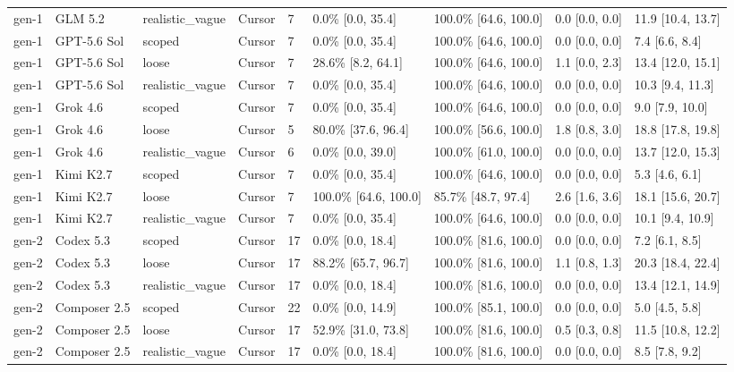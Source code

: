 \begin{tabular}{lllllllll}
gen-1 & GLM 5.2 & realistic\_vague & Cursor & 7 & 0.0\% [0.0, 35.4] & 100.0\% [64.6, 100.0] & 0.0 [0.0, 0.0] & 11.9 [10.4, 13.7] \\
gen-1 & GPT-5.6 Sol & scoped & Cursor & 7 & 0.0\% [0.0, 35.4] & 100.0\% [64.6, 100.0] & 0.0 [0.0, 0.0] & 7.4 [6.6, 8.4] \\
gen-1 & GPT-5.6 Sol & loose & Cursor & 7 & 28.6\% [8.2, 64.1] & 100.0\% [64.6, 100.0] & 1.1 [0.0, 2.3] & 13.4 [12.0, 15.1] \\
gen-1 & GPT-5.6 Sol & realistic\_vague & Cursor & 7 & 0.0\% [0.0, 35.4] & 100.0\% [64.6, 100.0] & 0.0 [0.0, 0.0] & 10.3 [9.4, 11.3] \\
gen-1 & Grok 4.6 & scoped & Cursor & 7 & 0.0\% [0.0, 35.4] & 100.0\% [64.6, 100.0] & 0.0 [0.0, 0.0] & 9.0 [7.9, 10.0] \\
gen-1 & Grok 4.6 & loose & Cursor & 5 & 80.0\% [37.6, 96.4] & 100.0\% [56.6, 100.0] & 1.8 [0.8, 3.0] & 18.8 [17.8, 19.8] \\
gen-1 & Grok 4.6 & realistic\_vague & Cursor & 6 & 0.0\% [0.0, 39.0] & 100.0\% [61.0, 100.0] & 0.0 [0.0, 0.0] & 13.7 [12.0, 15.3] \\
gen-1 & Kimi K2.7 & scoped & Cursor & 7 & 0.0\% [0.0, 35.4] & 100.0\% [64.6, 100.0] & 0.0 [0.0, 0.0] & 5.3 [4.6, 6.1] \\
gen-1 & Kimi K2.7 & loose & Cursor & 7 & 100.0\% [64.6, 100.0] & 85.7\% [48.7, 97.4] & 2.6 [1.6, 3.6] & 18.1 [15.6, 20.7] \\
gen-1 & Kimi K2.7 & realistic\_vague & Cursor & 7 & 0.0\% [0.0, 35.4] & 100.0\% [64.6, 100.0] & 0.0 [0.0, 0.0] & 10.1 [9.4, 10.9] \\
gen-2 & Codex 5.3 & scoped & Cursor & 17 & 0.0\% [0.0, 18.4] & 100.0\% [81.6, 100.0] & 0.0 [0.0, 0.0] & 7.2 [6.1, 8.5] \\
gen-2 & Codex 5.3 & loose & Cursor & 17 & 88.2\% [65.7, 96.7] & 100.0\% [81.6, 100.0] & 1.1 [0.8, 1.3] & 20.3 [18.4, 22.4] \\
gen-2 & Codex 5.3 & realistic\_vague & Cursor & 17 & 0.0\% [0.0, 18.4] & 100.0\% [81.6, 100.0] & 0.0 [0.0, 0.0] & 13.4 [12.1, 14.9] \\
gen-2 & Composer 2.5 & scoped & Cursor & 22 & 0.0\% [0.0, 14.9] & 100.0\% [85.1, 100.0] & 0.0 [0.0, 0.0] & 5.0 [4.5, 5.8] \\
gen-2 & Composer 2.5 & loose & Cursor & 17 & 52.9\% [31.0, 73.8] & 100.0\% [81.6, 100.0] & 0.5 [0.3, 0.8] & 11.5 [10.8, 12.2] \\
gen-2 & Composer 2.5 & realistic\_vague & Cursor & 17 & 0.0\% [0.0, 18.4] & 100.0\% [81.6, 100.0] & 0.0 [0.0, 0.0] & 8.5 [7.8, 9.2] \\

\end{tabular}
